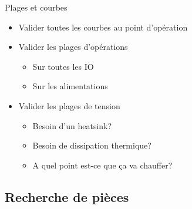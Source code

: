 \begin{frame}{Plages et courbes}
    \begin{twocolumns}
        \leftcol
        \begin{itemize}
            \item Valider toutes les courbes au point d'opération
            \item Valider les plages d'opérations
            \begin{itemize}
                \item Sur toutes les IO
                \item Sur les alimentations
            \end{itemize}
        \end{itemize}
        \rightcol
        \begin{itemize}
            \item Valider les plages de tension
            \begin{itemize}
                \item Besoin d'un heatsink?
                \item Besoin de dissipation thermique?
                \item A quel point est-ce que ça va chauffer?
            \end{itemize}
        \end{itemize}
    \end{twocolumns}

\end{frame}


\subsection{Recherche de pièces}

